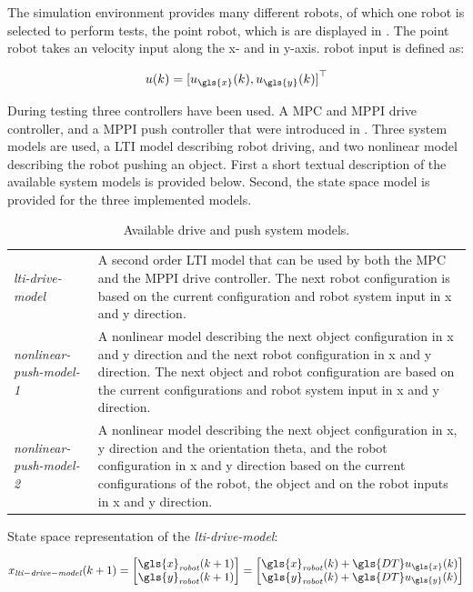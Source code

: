 The simulation environment provides many different robots, of which one robot is selected to perform tests, the point robot, which is are displayed in . The point robot takes an velocity input along the \gls{x}- and in \gls{y}-axis.\bs
robot input is defined as:\bs

\[ u(k) = {[ u_{\gls{x}}(k), u_{\gls{y}}(k) ]}^\top \]


During testing three controllers have been used. A \ac{MPC} and \ac{MPPI} drive controller, and a \ac{MPPI} push controller that were introduced in . Three system models are used, a \ac{LTI} model describing robot driving, and two nonlinear model describing the robot pushing an object. First a short textual description of the available system models is provided below. Second, the state space model is provided for the three implemented models.\bs


\begin{table}[H]
\centering
\begin{tabular}%
  {>{\raggedright\arraybackslash}p{}%
   >{\raggedright\arraybackslash}p{}}
\textit{lti-drive-model} & A second order \ac{LTI} model that can be used by both the \ac{MPC} and the \ac{MPPI} drive controller. The next robot configuration is based on the current configuration and robot system input in \gls{x} and \gls{y} direction. \\
\textit{nonlinear-push-model-1} & A nonlinear model describing the next object configuration in \gls{x} and \gls{y} direction and the next robot configuration in \gls{x} and \gls{y} direction. The next object and robot configuration are based on the current configurations and robot system input in \gls{x} and \gls{y} direction.\\
\textit{nonlinear-push-model-2} & A nonlinear model describing the next object configuration in \gls{x}, \gls{y} direction and the orientation \gls{theta}, and the robot configuration in \gls{x} and \gls{y} direction based on the current configurations of the robot, the object and on the robot inputs in \gls{x} and \gls{y} direction.\\
\end{tabular}
\caption{Available drive and push system models.}\label{table:available_system_models}
\end{table}

State space representation of the \textit{lti-drive-model}:\bs

\begin{equation}
\label{eq:lti-drive-model}
x_{\mathit{lti-drive-model}}(k+1)=
\begin{bmatrix}
\gls{x}_\mathit{robot}(k+1)\\
\gls{y}_\mathit{robot}(k+1)
\end{bmatrix}
=
\begin{bmatrix}
\gls{x}_{\mathit{robot}}(k) + \gls{DT} u_{\gls{x}}(k)\\
\gls{y}_{\mathit{robot}}(k) + \gls{DT} u_{\gls{y}}(k)
\end{bmatrix}
\end{equation}

